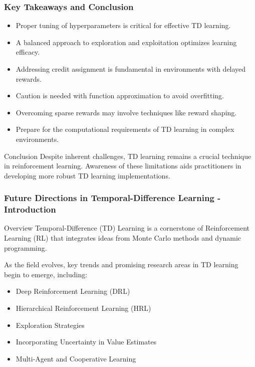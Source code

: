 \documentclass[aspectratio=169]{beamer}
\begin{document}
\begin{frame}[fragile]
    \frametitle{Key Takeaways and Conclusion}
    \begin{itemize}
        \item Proper tuning of hyperparameters is critical for effective TD learning.
        \item A balanced approach to exploration and exploitation optimizes learning efficacy.
        \item Addressing credit assignment is fundamental in environments with delayed rewards.
        \item Caution is needed with function approximation to avoid overfitting.
        \item Overcoming sparse rewards may involve techniques like reward shaping.
        \item Prepare for the computational requirements of TD learning in complex environments.
    \end{itemize}
    
    \begin{block}{Conclusion}
        Despite inherent challenges, TD learning remains a crucial technique in reinforcement learning. Awareness of these limitations aids practitioners in developing more robust TD learning implementations.
    \end{block}
\end{frame}

\begin{frame}[fragile]
    \frametitle{Future Directions in Temporal-Difference Learning - Introduction}
    \begin{block}{Overview}
        Temporal-Difference (TD) Learning is a cornerstone of Reinforcement Learning (RL) that integrates ideas from Monte Carlo methods and dynamic programming.
    \end{block}
    As the field evolves, key trends and promising research areas in TD learning begin to emerge, including:
    \begin{itemize}
        \item Deep Reinforcement Learning (DRL)
        \item Hierarchical Reinforcement Learning (HRL)
        \item Exploration Strategies
        \item Incorporating Uncertainty in Value Estimates
        \item Multi-Agent and Cooperative Learning
    \end{itemize}
\end{frame}
\end{document}
